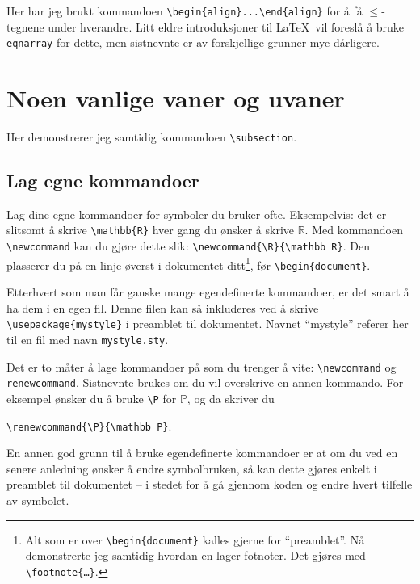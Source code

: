 \documentclass[a4paper, norsk]{article}  %
\newcommand{\R}{\mathbb{R}}
\renewcommand{\P}{\mathbb{P}}
\begin{document}
Her har jeg brukt kommandoen \verb|\begin{align}...\end{align}| for å få $\le$-tegnene under hverandre. Litt eldre introduksjoner til \LaTeX\ vil foreslå å bruke \texttt{eqnarray} for dette, men sistnevnte er av forskjellige grunner mye dårligere. 

\section{Noen vanlige vaner og uvaner}
\label{sec:vaner}

Her demonstrerer jeg samtidig kommandoen \verb|\subsection|.

\subsection{Lag egne kommandoer}

Lag dine egne kommandoer for symboler du bruker ofte. Eksempelvis: det er slitsomt å skrive \verb|\mathbb{R}| hver gang du ønsker å skrive $\mathbb{R}$. Med kommandoen \verb|\newcommand| kan du gjøre dette slik: \verb|\newcommand{\R}{\mathbb R}|. Den plasserer du på en linje øverst i dokumentet ditt\footnote{Alt som er over \texttt{\textbackslash begin\{document\}} kalles gjerne for ``preamblet''. Nå demonstrerte jeg samtidig hvordan en lager fotnoter. Det gjøres med \texttt{\textbackslash footnote\{\ldots\}}.}, før \verb|\begin{document}|.

Etterhvert som man får ganske mange egendefinerte kommandoer, er det smart å ha dem i en egen fil. Denne filen kan så inkluderes ved å skrive \verb|\usepackage{mystyle}| i preamblet til dokumentet. Navnet ``mystyle'' referer her til en fil med navn \verb|mystyle.sty|.

Det er to måter å lage kommandoer på som du trenger å vite: \verb|\newcommand| og \verb|renewcommand|. Sistnevnte brukes om du vil overskrive en annen kommando. For eksempel ønsker du å bruke \verb|\P| for $\P$, og da skriver du 
\begin{center}
    \texttt{\textbackslash renewcommand\{\textbackslash P\}\{\textbackslash mathbb P\}}.
\end{center}

En annen god grunn til å bruke egendefinerte kommandoer er at om du ved en senere anledning ønsker å endre symbolbruken, så kan dette gjøres enkelt i preamblet til dokumentet -- i stedet for å gå gjennom koden og endre hvert tilfelle av symbolet.
\end{document}
